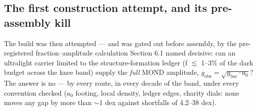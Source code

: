 \documentclass[11pt,a4paper]{article}
\begin{document}
\subsection{The first construction attempt, and its pre-assembly kill}

The build was then attempted --- and was gated out before assembly, by the pre-registered fraction--amplitude calculation Section 6.1 named decisive: can an ultralight carrier limited to the structure-formation ledger (f $\lesssim$ 1--3\% of the dark budget across the knee band) supply the \emph{full} MOND amplitude, $g_{\mathrm{obs}} = \sqrt{g_{\mathrm{bar}}\cdot a_0}$? The answer is no --- by every route, in every decade of the band, under every convention checked ($a_{0}$ footing, local density, ledger edges, charity dials: none moves any gap by more than $\sim$1 dex against shortfalls of 4.2--38 dex).
\end{document}
